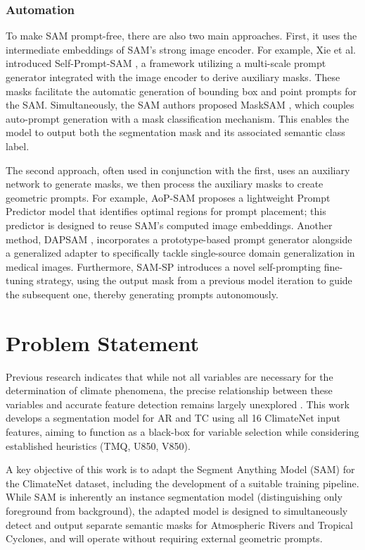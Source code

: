 \subsubsection{Automation}

To make SAM prompt-free, there are also two main approaches. First, it uses the intermediate embeddings of SAM's strong image encoder. For example, Xie et al. introduced Self-Prompt-SAM \cite{xie2025self}, a framework utilizing a multi-scale prompt generator integrated with the image encoder to derive auxiliary masks. These masks facilitate the automatic generation of bounding box and point prompts for the SAM. Simultaneously, the SAM authors proposed MaskSAM \cite{xie2024masksam} , which couples auto-prompt generation with a mask classification mechanism. This enables the model to output both the segmentation mask and its associated semantic class label.

The second approach, often used in conjunction with the first, uses an auxiliary network to generate masks, we then process the auxiliary masks to create geometric prompts. For example, AoP-SAM  \cite{chen2025aop}  proposes a lightweight Prompt Predictor model that identifies optimal regions for prompt placement; this predictor is designed to reuse SAM's computed image embeddings. Another method, DAPSAM  \cite{wei2024prompting}, incorporates a prototype-based prompt generator alongside a generalized adapter to specifically tackle single-source domain generalization in medical images. Furthermore, SAM-SP \cite{zhou2024sam} introduces a novel self-prompting fine-tuning strategy, using the output mask from a previous model iteration to guide the subsequent one, thereby generating prompts autonomously.

\section{Problem Statement}
Previous research indicates that while not all variables are necessary for the determination of climate phenomena, the precise relationship between these variables and accurate feature detection remains largely unexplored \cite{radke2024explaining, prabhat2020climatenet}. This work develops a segmentation model for AR and TC using all 16 ClimateNet input features, aiming to function as a black-box for variable selection while considering established heuristics (TMQ, U850, V850). 

A key objective of this work is to adapt the Segment Anything Model (SAM) for the ClimateNet dataset, including the development of a suitable training pipeline. While SAM is inherently an instance segmentation model (distinguishing only foreground from background), the adapted model is designed to simultaneously detect and output separate semantic masks for Atmospheric Rivers and Tropical Cyclones, and will operate without requiring external geometric prompts.


